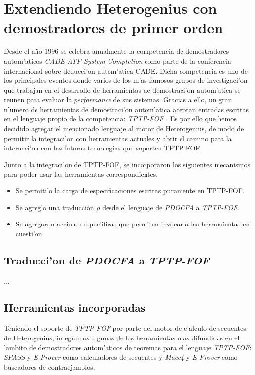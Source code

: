 \section{Extendiendo Heterogenius con demostradores de primer orden}

Desde el a\~no 1996 se celebra anualmente la competencia de demostradores autom'aticos \emph{CADE ATP System Comptetion} \cite{casc} como parte de la conferencia internacional sobre deducci'on autom'atica CADE.
Dicha competencia es uno de los principales eventos donde varios de los m'as famosos grupos de investigaci'on que trabajan en el desarrollo de herramientas de demostraci'on autom'atica se reunen para evaluar la \emph{performance} de sus sistemas.
Gracias a ello, un gran n'umero de herramientas de demostraci'on autom'atica aceptan entradas escritas en el lenguaje propio de la competencia: \textit{TPTP-FOF} \cite{fof}. Es por ello que hemos decidido agregar el mencionado lenguaje al motor de Heterogenius, de modo de permitir la integraci'on con herramientas actuales y abrir el camino para la interacci'on con las futuras tecnologías que soporten TPTP-FOF.

Junto a la integraci'on de TPTP-FOF, se incorporaron los siguientes mecanismos para poder usar las herramientas correspondientes.

\begin{itemize}
\item Se permiti'o la carga de especificaciones escritas puramente en TPTP-FOF.

\item Se agreg'o una traducción $\rho$ desde el lenguaje de \textit{PDOCFA} a \textit{TPTP-FOF}. 

\item Se agregaron acciones espec'ificas que permiten invocar a las herramientas en cuesti'on.
\end{itemize}

\subsection{Traducci'on de \emph{PDOCFA} a \emph{TPTP-FOF}}

...

\subsection{Herramientas incorporadas}

Teniendo el soporte de \textit{TPTP-FOF} por parte del motor de c'alculo de secuentes de Heterogenius, integramos algunas de las herramientas mas difundidas en el 'ambito de demostradores autom'aticos de teoremas para el lenguaje \textit{TPTP-FOF}: \textit{SPASS} \cite{WDFKSW09} y \textit{E-Prover} \cite{s13} como calculadores de secuentes y \textit{Mace4} \cite{m05} y \textit{E-Prover} como buscadores de contraejemplos.

